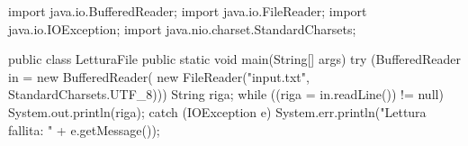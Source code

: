 \begin{unipdcode}[language=Java]
import java.io.BufferedReader;
import java.io.FileReader;
import java.io.IOException;
import java.nio.charset.StandardCharsets;

public class LetturaFile {
    public static void main(String[] args) {
        try (BufferedReader in = new BufferedReader(
                new FileReader("input.txt", StandardCharsets.UTF_8))) {
            String riga;
            while ((riga = in.readLine()) != null) {
                System.out.println(riga);
            }
        } catch (IOException e) {
            System.err.println("Lettura fallita: " + e.getMessage());
        }
    }
}
\end{unipdcode}
